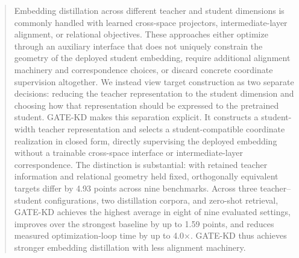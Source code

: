 \begin{abstract}
Embedding distillation across different teacher and student dimensions is commonly handled with learned cross-space projectors, intermediate-layer alignment, or relational objectives. These approaches either optimize through an auxiliary interface that does not uniquely constrain the geometry of the deployed student embedding, require additional alignment machinery and correspondence choices, or discard concrete coordinate supervision altogether. We instead view target construction as two separate decisions: reducing the teacher representation to the student dimension and choosing how that representation should be expressed to the pretrained student. GATE-KD makes this separation explicit. It constructs a student-width teacher representation and selects a student-compatible coordinate realization in closed form, directly supervising the deployed embedding without a trainable cross-space interface or intermediate-layer correspondence. The distinction is substantial: with retained teacher information and relational geometry held fixed, orthogonally equivalent targets differ by 4.93 points across nine benchmarks. Across three teacher–student configurations, two distillation corpora, and zero-shot retrieval, GATE-KD achieves the highest average in eight of nine evaluated settings, improves over the strongest baseline by up to 1.59 points, and reduces measured optimization-loop time by up to 4.0×. GATE-KD thus achieves stronger embedding distillation with less alignment machinery.
\end{abstract}